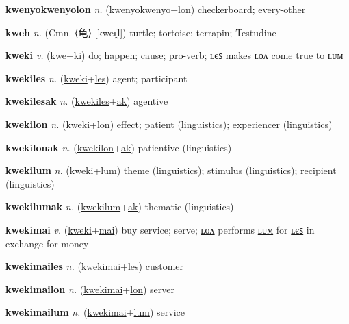 \textbf{\hypertarget{kwenyokwenyolon}{kwenyokwenyolon}} \textit{n.} (\hyperlink{kwenyokwenyo}{kwenyokwenyo}+\allowbreak \hyperlink{lon}{lon})
checkerboard; every-other

\textbf{\hypertarget{kweh}{kweh}} \textit{n.} (Cmn. ⟨{\chinese{}龟}⟩ [kweɪ̯˥])
turtle; tortoise; terrapin; Testudine

\textbf{\hypertarget{kweki}{kweki}} \textit{v.} (\hyperlink{kwe}{kwe}+\allowbreak \hyperlink{ki}{ki})
do; happen; cause; pro-verb; \hyperlink{kwekiles}{ʟєꜱ} makes \hyperlink{kwekilon}{ʟᴏᴧ} come true to \hyperlink{kwekilum}{ʟᴜᴍ}

\textbf{\hypertarget{kwekiles}{kwekiles}} \textit{n.} (\hyperlink{kweki}{kweki}+\allowbreak \hyperlink{les}{les})
agent; participant

\textbf{\hypertarget{kwekilesak}{kwekilesak}} \textit{n.} (\hyperlink{kwekiles}{kwekiles}+\allowbreak \hyperlink{ak}{ak})
agentive

\textbf{\hypertarget{kwekilon}{kwekilon}} \textit{n.} (\hyperlink{kweki}{kweki}+\allowbreak \hyperlink{lon}{lon})
effect; patient (linguistics); experiencer (linguistics)

\textbf{\hypertarget{kwekilonak}{kwekilonak}} \textit{n.} (\hyperlink{kwekilon}{kwekilon}+\allowbreak \hyperlink{ak}{ak})
patientive (linguistics)

\textbf{\hypertarget{kwekilum}{kwekilum}} \textit{n.} (\hyperlink{kweki}{kweki}+\allowbreak \hyperlink{lum}{lum})
theme (linguistics); stimulus (linguistics); recipient (linguistics)

\textbf{\hypertarget{kwekilumak}{kwekilumak}} \textit{n.} (\hyperlink{kwekilum}{kwekilum}+\allowbreak \hyperlink{ak}{ak})
thematic (linguistics)

\textbf{\hypertarget{kwekimai}{kwekimai}} \textit{v.} (\hyperlink{kweki}{kweki}+\allowbreak \hyperlink{mai}{mai})
buy service; serve; \hyperlink{kwekimailon}{ʟᴏᴧ} performs \hyperlink{kwekimailum}{ʟᴜᴍ} for \hyperlink{kwekimailes}{ʟєꜱ} in exchange for money

\textbf{\hypertarget{kwekimailes}{kwekimailes}} \textit{n.} (\hyperlink{kwekimai}{kwekimai}+\allowbreak \hyperlink{les}{les})
customer

\textbf{\hypertarget{kwekimailon}{kwekimailon}} \textit{n.} (\hyperlink{kwekimai}{kwekimai}+\allowbreak \hyperlink{lon}{lon})
server

\textbf{\hypertarget{kwekimailum}{kwekimailum}} \textit{n.} (\hyperlink{kwekimai}{kwekimai}+\allowbreak \hyperlink{lum}{lum})
service

